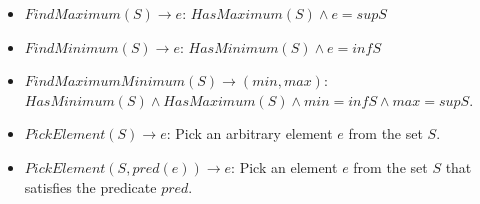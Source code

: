 \documentclass[12pt, letterpaper, oneside]{book}
\begin{document}
\begin{itemize}
  \item $FindMaximum(S) \rightarrow e$: $HasMaximum(S) \land e = sup S$
  \item $FindMinimum(S) \rightarrow e$: $HasMinimum(S) \land e = inf S$
  \item $FindMaximumMinimum(S) \rightarrow (min, max)$: $HasMinimum(S) \land HasMaximum(S) \land min = inf S \land
          max = sup S$.
  \item $PickElement(S) \rightarrow e$: Pick an arbitrary element $e$ from the set $S$.
  \item $PickElement(S, pred(e)) \rightarrow e$: Pick an element $e$ from the set $S$ that satisfies the predicate
        $pred$.
\end{itemize}
\end{document}
